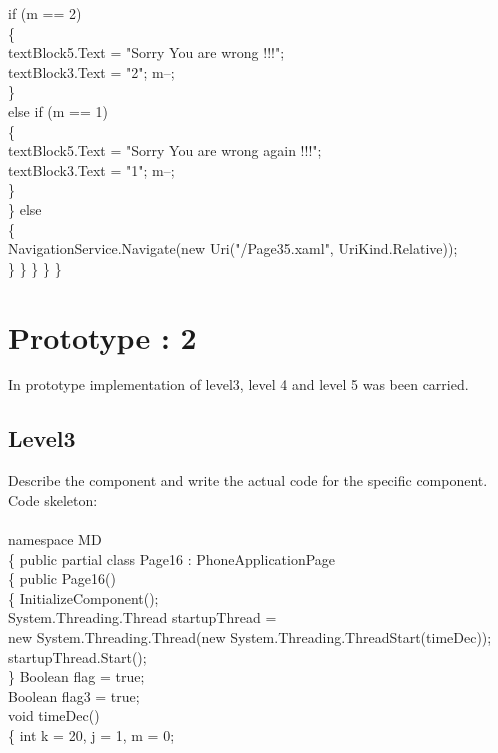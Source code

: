 {{                    if (m == 2)\\
                    \{\\
                        textBlock5.Text = "Sorry You are wrong !!!";\\
                        textBlock3.Text = "2"; m--;\\
                    \}\\
                    else if (m == 1)\\
                    \{\\
                        textBlock5.Text = "Sorry You are wrong again !!!";\\
                        textBlock3.Text = "1"; m--;\\
                    \}\\
                \}
                else\\
                \{\\
                    NavigationService.Navigate(new Uri("/Page35.xaml", UriKind.Relative));\\
                \}
            \}
        \}
    \}
\}\\





\section{Prototype : 2}
\hspace{1cm}In prototype  implementation of level3, level 4 and level 5  was been carried.

\subsection{Level3}
\ttfamily \hspace{1cm}Describe the component and write the actual code for the specific component.
Code skeleton:\\
\\
namespace MD\\
\{
    public partial class Page16 : PhoneApplicationPage\\
    \{
        public Page16()\\
        \{
            InitializeComponent();\\
            System.Threading.Thread startupThread =\\
                             new System.Threading.Thread(new System.Threading.ThreadStart(timeDec));\\
            startupThread.Start();\\
        \}
        Boolean flag = true;\\
        Boolean flag3 = true;\\
        void timeDec()\\
        \{
            int k = 20, j = 1, m = 0;\\
            
}}
